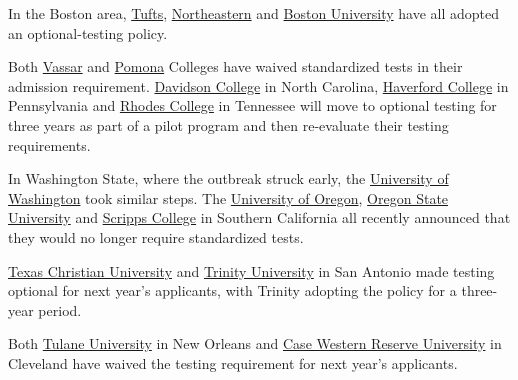 In the Boston area,
\href{https://admissions.tufts.edu/blogs/inside-admissions/post/tufts-introduces-sat-act-test-optional-admissions-policy/}{Tufts},
\href{https://news.northeastern.edu/2020/04/07/northeastern-adopts-test-optional-policy-for-students-applying-for-the-2021-22-academic-year-due-to-uncertainty-caused-by-covid-19/}{Northeastern}
and
\href{https://www.bu.edu/articles/2020/bu-standardized-tests-optional-admission/}{Boston
University} have all adopted an optional-testing policy.

Both
\href{https://stories.vassar.edu/2020/vassar-waives-standardized-tests-for-admission.html}{Vassar}
and
\href{https://www.pomona.edu/news/2020/04/02-pomona-college-adopts-test-optional-policy-students-applying-entry-fall-2021}{Pomona}
Colleges have waived standardized tests in their admission requirement.
\href{https://www.davidson.edu/news/2020/03/30/davidson-college-goes-test-optional-three-year-pilot}{Davidson
College} in North Carolina,
\href{https://www.haverford.edu/admission/blog/haverford-adopts-test-optional-policy}{Haverford
College} in Pennsylvania and
\href{https://news.rhodes.edu/stories/rhodes-college-adopts-test-optional-admissions-policy}{Rhodes
College} in Tennessee will move to optional testing for three years as
part of a pilot program and then re-evaluate their testing requirements.

In Washington State, where the outbreak struck early, the
\href{https://admit.washington.edu/apply/freshman/how-to-apply/test-scores/}{University
of Washington} took similar steps. The
\href{https://around.uoregon.edu/content/uo-adopts-sat-and-act-test-optional-admissions-policy}{University
of Oregon},
\href{https://admissions.oregonstate.edu/test-optional-admissions}{Oregon
State University} and
\href{https://www.scrippscollege.edu/admission/admission-announcements}{Scripps
College} in Southern California all recently announced that they would
no longer require standardized tests.

\href{https://admissions.tcu.edu/frogblog/posts/2020/temporarily-test-optional.php}{Texas
Christian University} and
\href{https://new.trinity.edu/news/trinity-authorizes-test-optional-admissions-students}{Trinity
University} in San Antonio made testing optional for next year's
applicants, with Trinity adopting the policy for a three-year period.

Both
\href{https://admission.tulane.edu/apply/instructions/standardized-tests}{Tulane
University} in New Orleans and
\href{https://case.edu/admission/features/admission-financial-aid/message-dean}{Case
Western Reserve University} in Cleveland have waived the testing
requirement for next year's applicants.

